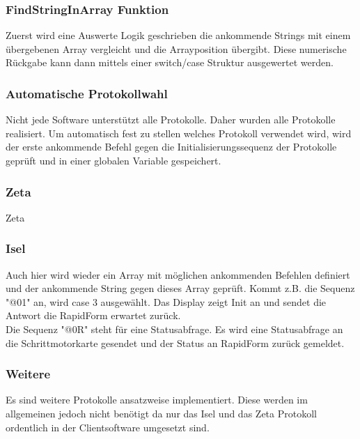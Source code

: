 \subsubsection{FindStringInArray Funktion}
Zuerst wird eine Auswerte Logik geschrieben die ankommende Strings mit einem übergebenen Array vergleicht und die Arrayposition übergibt. Diese numerische Rückgabe kann dann mittels einer switch/case Struktur ausgewertet werden.
\lstset{language=C, basicstyle=\footnotesize, showstringspaces=false, tabsize=8}

\subsubsection{Automatische Protokollwahl}
Nicht jede Software unterstützt alle Protokolle. Daher wurden alle Protokolle realisiert. Um automatisch fest zu stellen welches Protokoll verwendet wird, wird der erste ankommende Befehl gegen die Initialisierungssequenz der Protokolle geprüft und in einer globalen Variable gespeichert.
\lstset{language=C, basicstyle=\footnotesize, showstringspaces=false, tabsize=8}

\subsubsection{Zeta}
Zeta
\subsubsection{Isel}
Auch hier wird wieder ein Array mit möglichen ankommenden Befehlen definiert und der ankommende String gegen dieses Array geprüft. Kommt z.B. die Sequenz "@01" an, wird case 3 ausgewählt. Das Display zeigt Init an und sendet die Antwort die RapidForm erwartet zurück.\\
Die Sequenz "@0R" steht für eine Statusabfrage. Es wird eine Statusabfrage an die Schrittmotorkarte gesendet und der Status an RapidForm zurück gemeldet.
\lstset{language=C, basicstyle=\footnotesize, showstringspaces=false, tabsize=8}

\subsubsection{Weitere}
Es sind weitere Protokolle ansatzweise implementiert. Diese werden im allgemeinen jedoch nicht benötigt da nur das Isel und das Zeta Protokoll ordentlich in der Clientsoftware umgesetzt sind.